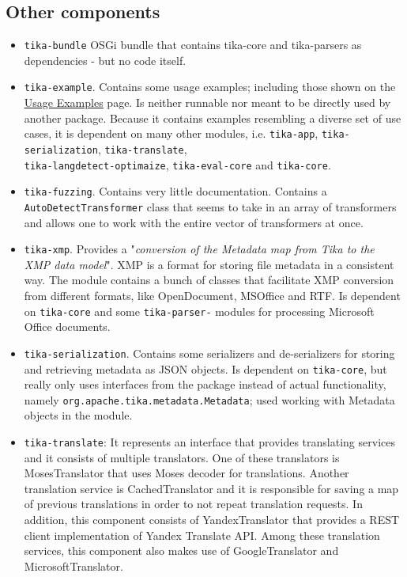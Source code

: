 \documentclass{article}
\begin{document}
\subsection{Other components}
\begin{itemize}
    \item \texttt{tika-bundle} OSGi bundle that contains tika-core and tika-parsers as dependencies - but no code itself.
    \item \texttt{tika-example}. Contains some usage examples; including those shown on the \href{https://tika.apache.org/1.20/examples.html#Apache_Tika_API_Usage_Examples}{\underline{Usage Examples}} page. Is neither runnable nor meant to be directly used by another package. Because it contains examples resembling a diverse set of use cases, it is dependent on many other modules, i.e. \texttt{tika-app}, \texttt{tika-serialization}, \texttt{tika-translate},\\ \texttt{tika-langdetect-optimaize}, \texttt{tika-eval-core} and \texttt{tika-core}.
    \item \texttt{tika-fuzzing}. Contains very little documentation. Contains a \\ \texttt{AutoDetectTransformer} class that seems to take in an array of transformers and allows one to work with the entire vector of transformers at once.
    \item \texttt{tika-xmp}. Provides a "\textit{conversion of the Metadata map from Tika to the XMP data model}". XMP is a format for storing file metadata in a consistent way. The module contains a bunch of classes that facilitate XMP conversion from different formats, like OpenDocument, MSOffice and RTF. Is dependent on \texttt{tika-core} and some \texttt{tika-parser-} modules for processing Microsoft Office documents.
    \item \texttt{tika-serialization}. Contains some serializers and de-serializers for storing and retrieving metadata as JSON objects. Is dependent on \texttt{tika-core}, but really only uses interfaces from the package instead of actual functionality, namely \texttt{org.apache.tika.metadata.Metadata}; used working with Metadata objects in the module. 
    \item\texttt {tika-translate}: It represents an interface that provides translating services and it consists of multiple translators. One of these translators is MosesTranslator that uses Moses decoder for translations. Another translation service is CachedTranslator and it is responsible for saving a map of previous translations in order to not repeat translation requests. In addition, this component consists of YandexTranslator that provides a REST client implementation of Yandex Translate API. Among these translation services, this component also makes use of GoogleTranslator and MicrosoftTranslator.

\end{itemize}
\end{document}
